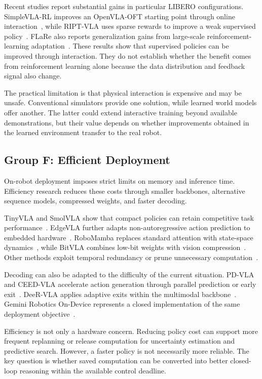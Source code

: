 \documentclass{ieeeaccess}
\begin{document}
Recent studies report substantial gains in particular LIBERO configurations. SimpleVLA-RL improves an OpenVLA-OFT starting point through online interaction~\cite{simplevlarl}, while RIPT-VLA uses sparse rewards to improve a weak supervised policy~\cite{riptvla}. FLaRe also reports generalization gains from large-scale reinforcement-learning adaptation~\cite{flarerl}. These results show that supervised policies can be improved through interaction. They do not establish whether the benefit comes from reinforcement learning alone because the data distribution and feedback signal also change.

The practical limitation is that physical interaction is expensive and may be unsafe. Conventional simulators provide one solution, while learned world models offer another. The latter could extend interactive training beyond available demonstrations, but their value depends on whether improvements obtained in the learned environment transfer to the real robot.

\subsection{Group F: Efficient Deployment}
\label{sec:groupF}

On-robot deployment imposes strict limits on memory and inference time. Efficiency research reduces these costs through smaller backbones, alternative sequence models, compressed weights, and faster decoding.

TinyVLA and SmolVLA show that compact policies can retain competitive task performance~\cite{tinyvla,smolvla}. EdgeVLA further adapts non-autoregressive action prediction to embedded hardware~\cite{edgevla}. RoboMamba replaces standard attention with state-space dynamics~\cite{robomamba}, while BitVLA combines low-bit weights with vision compression~\cite{bitvla}. Other methods exploit temporal redundancy or prune unnecessary computation~\cite{vlacache,efficientvla}.

Decoding can also be adapted to the difficulty of the current situation. PD-VLA and CEED-VLA accelerate action generation through parallel prediction or early exit~\cite{pdvla,ceedvla}. DeeR-VLA applies adaptive exits within the multimodal backbone~\cite{deervla}. Gemini Robotics On-Device represents a closed implementation of the same deployment objective~\cite{geminiondevice}.

Efficiency is not only a hardware concern. Reducing policy cost can support more frequent replanning or release computation for uncertainty estimation and predictive search. However, a faster policy is not necessarily more reliable. The key question is whether saved computation can be converted into better closed-loop reasoning within the available control deadline.
\end{document}
